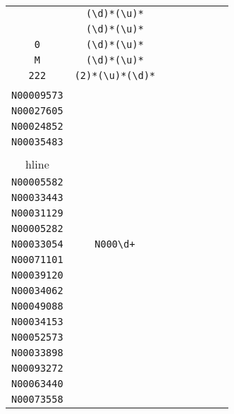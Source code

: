 \begin{longtable}{cccccccc}
\begin{tabular}{ll}
    \verb|JFX| & \verb|(\d)*(\u)*|\\
\verb|| & \verb|(\d)*(\u)*|\\
\verb|0| & \verb|(\d)*(\u)*|\\
\verb|M| & \verb|(\d)*(\u)*|\\
\verb|222| & \verb|(2)*(\u)*(\d)*|
\end{tabular}
\\\midrule 
\begin{tabular}{l}
    \verb|N00028139|\\
\verb|N00009573|\\
\verb|N00027605|\\
\verb|N00024852|\\
\verb|N00035483|\\
\\hline\\
\verb|N00005582|\\
\verb|N00033443|\\
\verb|N00031129|\\
\verb|N00005282|\\
\verb|N00033054|
\end{tabular}

&
\verb|N000\d+|
&

\begin{tabular}{l}
    \verb|N000\d\d\d\d\d|\\
\verb|N00071101|\\
\verb|N00039120|\\
\verb|N00034062|\\
\verb|N00049088|\\
\verb|N00034153|
\end{tabular}

&

\begin{tabular}{l}
    \verb|N000\d\d\d\d\d|\\
\verb|N00052573|\\
\verb|N00033898|\\
\verb|N00093272|\\
\verb|N00063440|\\
\verb|N00073558|
\end{tabular}

&


\end{longtable}
